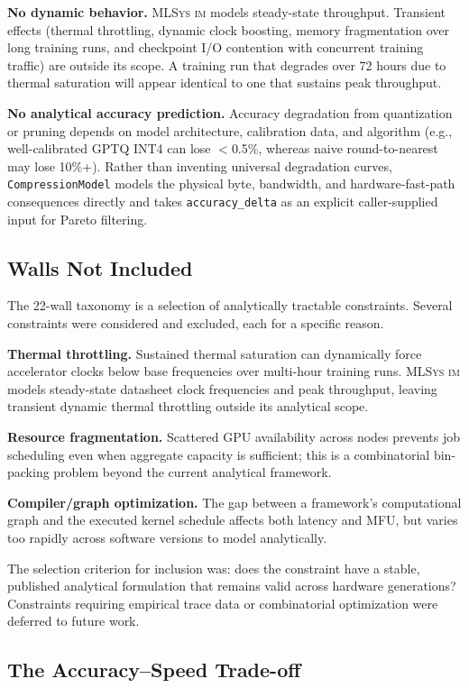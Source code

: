 \documentclass[10pt,twocolumn]{article}
\newcommand{\mlsysim}{\mbox{\textsc{MLSys}\,\textperiodcentered\,\textsc{im}}\xspace}
\begin{document}
\textbf{No dynamic behavior.} \mlsysim models steady-state throughput. Transient effects (thermal throttling, dynamic clock boosting, memory fragmentation over long training runs, and checkpoint I/O contention with concurrent training traffic) are outside its scope. A training run that degrades over 72 hours due to thermal saturation will appear identical to one that sustains peak throughput.

\textbf{No analytical accuracy prediction.} Accuracy degradation from quantization or pruning depends on model architecture, calibration data, and algorithm (e.g., well-calibrated GPTQ INT4 can lose $<$0.5\%, whereas naive round-to-nearest may lose 10\%+). Rather than inventing universal degradation curves, \texttt{CompressionModel} models the physical byte, bandwidth, and hardware-fast-path consequences directly and takes \texttt{accuracy\_delta} as an explicit caller-supplied input for Pareto filtering.

\subsection{Walls Not Included}

The 22-wall taxonomy is a selection of analytically tractable constraints. Several constraints were considered and excluded, each for a specific reason.

\textbf{Thermal throttling.} Sustained thermal saturation can dynamically force accelerator clocks below base frequencies over multi-hour training runs. \mlsysim models steady-state datasheet clock frequencies and peak throughput, leaving transient dynamic thermal throttling outside its analytical scope.

\textbf{Resource fragmentation.} Scattered GPU availability across nodes prevents job scheduling even when aggregate capacity is sufficient; this is a combinatorial bin-packing problem beyond the current analytical framework.

\textbf{Compiler/graph optimization.} The gap between a framework's computational graph and the executed kernel schedule affects both latency and MFU, but varies too rapidly across software versions to model analytically.

The selection criterion for inclusion was: does the constraint have a stable, published analytical formulation that remains valid across hardware generations? Constraints requiring empirical trace data or combinatorial optimization were deferred to future work.

\subsection{The Accuracy--Speed Trade-off}
\end{document}
